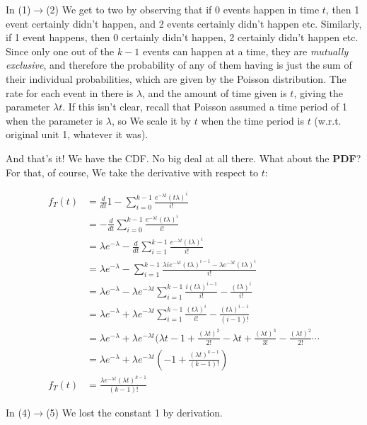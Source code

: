 \documentclass{article}
\begin{document}
		In (1)$\to$(2) We get to two by observing that if 0 events happen in time $t$, then 1 event certainly didn't happen, and 2 events certainly didn't happen etc. Similarly, if 1 event happens, then 0 certainly didn't happen, 2 certainly didn't happen etc. Since only one out of the $k-1$ events can happen at a time, they are \textit{mutually exclusive}, and therefore the probability of any of them having is just the sum of their individual probabilities, which are given by the Poisson distribution. The rate for each event in there is $\lambda$, and the amount of time given is $t$, giving the parameter $\lambda t$. If this isn't clear, recall that Poisson assumed a time period of 1 when the parameter is $\lambda$, so We scale it by $t$ when the time period is $t$ (w.r.t. original unit 1, whatever it was).
		
		And that's it! We have the CDF. No big deal at all there. What about the \textbf{PDF}? For that, of course, We take the derivative with respect to $t$:
		
		\begin{align}
		f_T(t) &= \frac{d}{dt} 1-\sum^{k-1}_{i=0} \frac{e^{-\lambda t}(t \lambda)^{i}}{i!}  \\
		&= -\frac{d}{dt}\sum^{k-1}_{i=0} \frac{e^{-\lambda t}(t \lambda)^{i}}{i!}  \\
		&= \lambda e^{-\lambda} -\frac{d}{dt}\sum^{k-1}_{i=1} \frac{e^{-\lambda t}(t \lambda)^{i}}{i!}\\
		&= \lambda e^{-\lambda} -\sum^{k-1}_{i=1} \frac{\lambda ie^{-\lambda t}(t \lambda)^{i-1}-\lambda e^{-\lambda t}(t \lambda)^{i}}{i!}\\
		&= \lambda e^{-\lambda} -\lambda e^{-\lambda t}\sum^{k-1}_{i=1} \frac{i(t \lambda)^{i-1}}{i!}-\frac{(t \lambda)^{i}}{i!}\\		
		&= \lambda e^{-\lambda} +\lambda e^{-\lambda t}\sum^{k-1}_{i=1} \frac{(t \lambda)^{i}}{i!}-\frac{(t \lambda)^{i-1}}{(i-1)!}\\
		&= \lambda e^{-\lambda} +\lambda e^{-\lambda t}(\lambda t-1+\frac{(\lambda t)^2}{2!} - \lambda t + \frac{(\lambda t)^3}{3!} - \frac{(\lambda t)^2}{2!}\cdots\\
		&= \lambda e^{-\lambda} +\lambda e^{-\lambda t}\left(-1 + \frac{(\lambda t)^{k-1}}{(k-1)!}\right)\\
		f_T(t)&= \frac{\lambda e^{-\lambda t}(\lambda t)^{k-1}}{(k-1)!}
		\end{align}
		
		In (4)$\to$(5) We lost the constant 1 by derivation.
		
\end{document}
